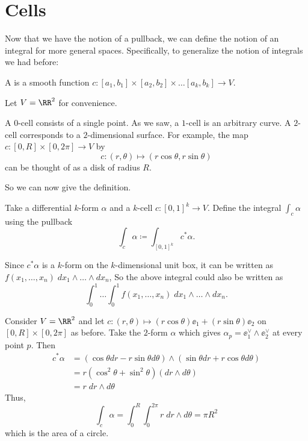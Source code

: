 \section{Cells}
Now that we have the notion of a pullback,
we can define the notion of an integral for more general spaces.
Specifically, to generalize the notion of integrals we had before:
\begin{definition}
	A  is a smooth function $c \colon [a_1, b_1] \times [a_2,b_2] \times \dots [a_k, b_k] \to V$.
\end{definition}
\begin{example}
	Let $V = \RR^2$ for convenience.
	\begin{enumerate}[(a)]
		\ii A $0$-cell consists of a single point.
		\ii As we saw, a $1$-cell is an arbitrary curve.
		\ii A $2$-cell corresponds to a $2$-dimensional surface.
		For example, the map $c \colon [0,R] \times [0,2\pi] \to V$ by
		\[ c \colon (r,\theta) \mapsto (r\cos\theta, r\sin\theta) \]
		can be thought of as a disk of radius $R$.
	\end{enumerate}
\end{example}
So we can now give the definition.
\begin{definition}
	Take a differential $k$-form $\alpha$ and a $k$-cell $c \colon [0,1]^k \to V$.
	Define the integral $\int_c \alpha$ using the pullback
	\[ \int_c \alpha \coloneq \int_{[0,1]^k} c^\ast \alpha. \]
\end{definition}
Since $c^\ast \alpha$ is a $k$-form on the $k$-dimensional unit box,
it can be written as $f(x_1, \dots, x_n) \; dx_1 \wedge \dots \wedge dx_n$,
So the above integral could also be written as
\[ \int_0^1 \dots \int_0^1 f(x_1, \dots, x_n) \; dx_1 \wedge \dots \wedge dx_n. \]

\begin{example}
	Consider $V = \RR^2$ and let $c \colon (r,\theta) \mapsto (r\cos\theta)\ee_1 + (r\sin\theta)\ee_2$
	on $[0,R] \times [0,2\pi]$ as before.
	Take the $2$-form $\alpha$ which gives $\alpha_p = \ee_1^\vee \wedge \ee_2^\vee$ at every point $p$.
	Then
	\begin{align*}
		c^\ast\alpha &=
		\left( \cos\theta dr - r\sin\theta d\theta \right)
		\wedge
		\left( \sin\theta dr + r\cos\theta d\theta \right) \\
		&= r(\cos^2\theta+\sin^2\theta) (dr \wedge d\theta) \\
		&= r \; dr \wedge d\theta
	\end{align*}
	Thus,
	\[ \int_c \alpha
		= \int_0^R \int_0^{2\pi} r \; dr \wedge d\theta
		= \pi R^2 \]
	which is the area of a circle.
\end{example}

